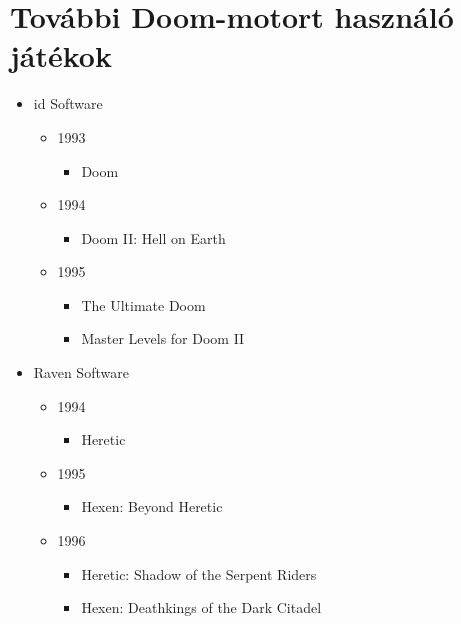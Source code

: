 \documentclass{thesis-ekf}
\theoremstyle{definition}
\begin{document}
\section{További Doom-motort használó játékok}

\begin{itemize}
    \item id Software
        \begin{itemize}
            \item 1993
                \begin{itemize}
                    \item Doom
                \end{itemize}
            \item 1994
                \begin{itemize}
                    \item Doom II: Hell on Earth
                \end{itemize}
            \item 1995
                \begin{itemize}
                    \item The Ultimate Doom
                    \item Master Levels for Doom II
                \end{itemize}
        \end{itemize}
    \item Raven Software
        \begin{itemize}
            \item 1994
                \begin{itemize}
                    \item Heretic
                \end{itemize}
            \item 1995
                \begin{itemize}
                    \item Hexen: Beyond Heretic
                \end{itemize}
            \item 1996
                \begin{itemize}
                    \item Heretic: Shadow of the Serpent Riders
                    \item Hexen: Deathkings of the Dark Citadel
                \end{itemize}
        \end{itemize}

\end{itemize}
\end{document}
